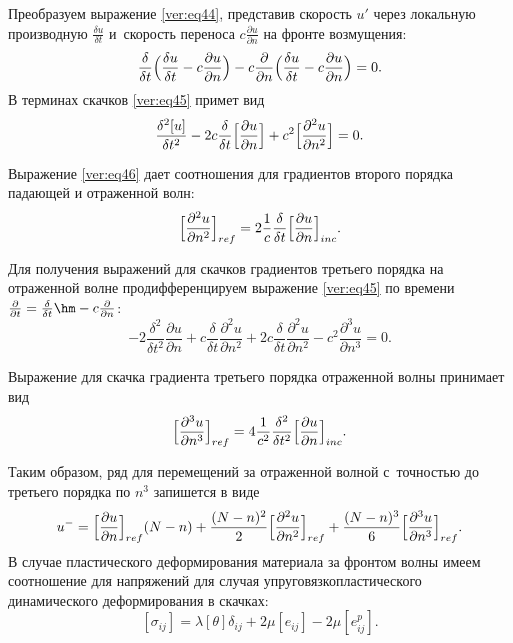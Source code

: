 Преобразуем выражение \eqref{ver:eq44}, представив скорость $u'$ через локальную производную $\frac{\delta u}{\delta t}$ и~скорость переноса $c\frac{\partial u}{\partial n}$ на фронте возмущения:
\begin{equation}
\label{ver:eq45}
\frac{\delta }{\delta t}
\Bigl(\frac{\delta u}{\delta t}-c\frac{\partial u}{\partial n}\Bigr)-c\frac{\partial}{\partial n}
\Bigl(\frac{\delta u}{\delta t}-c\frac{\partial u}{\partial n}\Bigr)=0.
\end{equation}
В терминах скачков \eqref{ver:eq45} примет вид
\begin{equation}
\label{ver:eq46}
\frac{\delta^2 [u]}{\delta t^2}-2c\frac{\delta}{\delta t}\Bigl[\frac{\partial u}{\partial n}\Bigr]+c^2\Bigl[\frac{\partial^2 u}{\partial n^2}\Bigr]=0.
\end{equation}

Выражение \eqref{ver:eq46} дает соотношения для градиентов второго порядка падающей и отраженной волн:
\begin{equation}
\label{ver:eq47}
\Bigl[\frac{\partial^2 u}{\partial n^2}\Bigr]_{ref}=2 \frac{1}{c} \frac{\delta}{\delta t}
\Bigl[\frac{\partial u}{\partial n}\Bigr]_{inc}.
\end{equation}

Для получения выражений для скачков градиентов третьего порядка на отраженной волне продифференцируем выражение \eqref{ver:eq45} по времени $\frac{\partial}{\partial t}=\frac{\delta}{\delta t}\hm -c\frac{\partial}{\partial n}$:
\begin{equation}
\label{ver:eq48}
-2\frac{\delta^2}{\delta t^2}\frac{\partial u}{\partial n}+c\frac{\delta}{\delta t}\frac{\partial^2 u}{\partial n^2}+2c\frac{\delta}{\delta t}\frac{\partial^2 u}{\partial n^2}-c^2\frac{\partial^3 u}{\partial n^3}=0.
\end{equation}

Выражение для скачка градиента третьего порядка отраженной волны  принимает вид
\begin{equation}
\label{ver:eq49}
\Bigl[\frac{\partial^3 u}{\partial n^3}\Bigr]_{ref}=4 \frac{1}{c^2} \frac{\delta^2}{\delta t^2}\Bigl[\frac{\partial u}{\partial n}\Bigr]_{inc}.
\end{equation}

Таким образом, ряд для перемещений за отраженной волной с~точностью до третьего порядка по $n^3$ запишется в виде
\begin{equation}
\label{ver:eq50}
u^{-}=\Bigl[\frac{\partial u}{\partial n}\Bigr]_{ref}(N-n)+
\frac{(N-n)^2}{2}\Bigl[\frac{\partial^2 u}{\partial n^2}\Bigr]_{ref}+\frac{(N-n)^3}{6}\Bigl[\frac{\partial^3 u}{\partial n^3}\Bigr]_{ref}.
\end{equation}
В случае пластического деформирования материала за фронтом волны имеем соотношение для напряжений для случая упруговязкопластического динамического деформирования в скачках:
\begin{equation}
\label{ver:eq51}
[\sigma_{ij}]=\lambda[\theta]\delta_{ij}+2\mu[e_{ij}]-2\mu[e_{ij}^p].
\end{equation}

